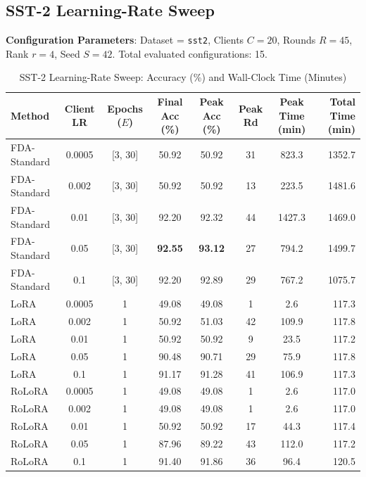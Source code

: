 \documentclass[10pt,a4paper]{article}
\begin{document}
\clearpage
\subsection{SST-2 Learning-Rate Sweep}

\textbf{Configuration Parameters}: Dataset = \texttt{sst2}, Clients $C = 20$, Rounds $R = 45$, Rank $r = 4$, Seed $S = 42$. Total evaluated configurations: 15.

\begin{table}[H]
\centering
\caption{SST-2 Learning-Rate Sweep: Accuracy (\%) and Wall-Clock Time (Minutes)}
\label{tab:lr4_e1_sst2}
\scriptsize
\setlength{\tabcolsep}{3.0pt}
\begin{tabular*}{\textwidth}{@{\extracolsep{\fill}}lccccccr@{}}
\toprule
\textbf{Method} & \textbf{Client LR} & \textbf{Epochs ($E$)} & \textbf{Final Acc (\%)} & \textbf{Peak Acc (\%)} & \textbf{Peak Rd} & \textbf{Peak Time (min)} & \textbf{Total Time (min)} \\
\midrule
FDA-Standard & 0.0005 & [3, 30] & 50.92 & 50.92 & 31 & 823.3 & 1352.7 \\
FDA-Standard & 0.002 & [3, 30] & 50.92 & 50.92 & 13 & 223.5 & 1481.6 \\
FDA-Standard & 0.01 & [3, 30] & 92.20 & 92.32 & 44 & 1427.3 & 1469.0 \\
FDA-Standard & 0.05 & [3, 30] & \textbf{92.55} & \textbf{93.12} & 27 & 794.2 & 1499.7 \\
FDA-Standard & 0.1 & [3, 30] & 92.20 & 92.89 & 29 & 767.2 & 1075.7 \\
\midrule
LoRA & 0.0005 & 1 & 49.08 & 49.08 & 1 & 2.6 & 117.3 \\
LoRA & 0.002 & 1 & 50.92 & 51.03 & 42 & 109.9 & 117.8 \\
LoRA & 0.01 & 1 & 50.92 & 50.92 & 9 & 23.5 & 117.2 \\
LoRA & 0.05 & 1 & 90.48 & 90.71 & 29 & 75.9 & 117.8 \\
LoRA & 0.1 & 1 & 91.17 & 91.28 & 41 & 106.9 & 117.3 \\
\midrule
RoLoRA & 0.0005 & 1 & 49.08 & 49.08 & 1 & 2.6 & 117.0 \\
RoLoRA & 0.002 & 1 & 49.08 & 49.08 & 1 & 2.6 & 117.0 \\
RoLoRA & 0.01 & 1 & 50.92 & 50.92 & 17 & 44.3 & 117.4 \\
RoLoRA & 0.05 & 1 & 87.96 & 89.22 & 43 & 112.0 & 117.2 \\
RoLoRA & 0.1 & 1 & 91.40 & 91.86 & 36 & 96.4 & 120.5 \\
\bottomrule
\end{tabular*}
\end{table}
\end{document}
